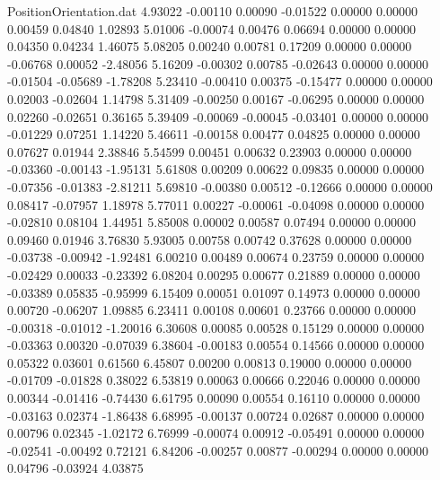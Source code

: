 \begin{filecontents}{PositionOrientation.dat}
   4.93022   -0.00110    0.00090    -0.01522    0.00000    0.00000    0.00459    0.04840    1.02893
   5.01006   -0.00074    0.00476     0.06694    0.00000    0.00000    0.04350    0.04234    1.46075
   5.08205    0.00240    0.00781     0.17209    0.00000    0.00000   -0.06768    0.00052   -2.48056
   5.16209   -0.00302    0.00785    -0.02643    0.00000    0.00000   -0.01504   -0.05689   -1.78208
   5.23410   -0.00410    0.00375    -0.15477    0.00000    0.00000    0.02003   -0.02604    1.14798
   5.31409   -0.00250    0.00167    -0.06295    0.00000    0.00000    0.02260   -0.02651    0.36165
   5.39409   -0.00069   -0.00045    -0.03401    0.00000    0.00000   -0.01229    0.07251    1.14220
   5.46611   -0.00158    0.00477     0.04825    0.00000    0.00000    0.07627    0.01944    2.38846
   5.54599    0.00451    0.00632     0.23903    0.00000    0.00000   -0.03360   -0.00143   -1.95131
   5.61808    0.00209    0.00622     0.09835    0.00000    0.00000   -0.07356   -0.01383   -2.81211
   5.69810   -0.00380    0.00512    -0.12666    0.00000    0.00000    0.08417   -0.07957    1.18978
   5.77011    0.00227   -0.00061    -0.04098    0.00000    0.00000   -0.02810    0.08104    1.44951
   5.85008    0.00002    0.00587     0.07494    0.00000    0.00000    0.09460    0.01946    3.76830
   5.93005    0.00758    0.00742     0.37628    0.00000    0.00000   -0.03738   -0.00942   -1.92481
   6.00210    0.00489    0.00674     0.23759    0.00000    0.00000   -0.02429    0.00033   -0.23392
   6.08204    0.00295    0.00677     0.21889    0.00000    0.00000   -0.03389    0.05835   -0.95999
   6.15409    0.00051    0.01097     0.14973    0.00000    0.00000    0.00720   -0.06207    1.09885
   6.23411    0.00108    0.00601     0.23766    0.00000    0.00000   -0.00318   -0.01012   -1.20016
   6.30608    0.00085    0.00528     0.15129    0.00000    0.00000   -0.03363    0.00320   -0.07039
   6.38604   -0.00183    0.00554     0.14566    0.00000    0.00000    0.05322    0.03601    0.61560
   6.45807    0.00200    0.00813     0.19000    0.00000    0.00000   -0.01709   -0.01828    0.38022
   6.53819    0.00063    0.00666     0.22046    0.00000    0.00000    0.00344   -0.01416   -0.74430
   6.61795    0.00090    0.00554     0.16110    0.00000    0.00000   -0.03163    0.02374   -1.86438
   6.68995   -0.00137    0.00724     0.02687    0.00000    0.00000    0.00796    0.02345   -1.02172
   6.76999   -0.00074    0.00912    -0.05491    0.00000    0.00000   -0.02541   -0.00492    0.72121
   6.84206   -0.00257    0.00877    -0.00294    0.00000    0.00000    0.04796   -0.03924    4.03875

\end{filecontents}
